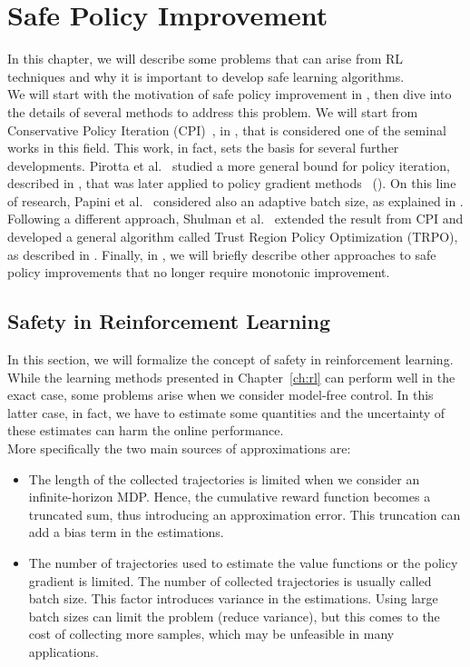 \chapter{Safe Policy Improvement}
\label{ch:safepg}
\thispagestyle{empty}

In this chapter, we will describe some problems that can arise from RL techniques and why it is important to develop safe learning algorithms. \\
We will start with the motivation of safe policy improvement in , then dive into the details of several methods to address this problem. We will start from Conservative Policy Iteration (CPI)~\cite{Kakade02approximatelyoptimal}, in , that is considered one of the seminal works in this field. This work, in fact, sets the basis for several further developments. Pirotta et al.~\cite{safe_iteration} studied a more general bound for policy iteration, described in , that was later applied to policy gradient methods~\cite{adaptive_step} (). On this line of research, Papini et al.~\cite{adaptive_batch} considered also an adaptive batch size, as explained in . Following a different approach, Shulman et al.~\cite{trpo} extended the result from CPI and developed a general algorithm called Trust Region Policy Optimization (TRPO), as described in . Finally, in , we will briefly describe other approaches to safe policy improvements that no longer require monotonic improvement.

\section{Safety in Reinforcement Learning}
\label{sec:whysafety}
In this section, we will formalize the concept of safety in reinforcement learning. While the learning methods presented in Chapter~\ref{ch:rl} can perform well in the exact case, some problems arise when we consider model-free control. In this latter case, in fact, we have to estimate some quantities and the uncertainty of these estimates can harm the online performance. \\
More specifically the two main sources of approximations are: 
\begin{itemize}
\item The length of the collected trajectories is limited when we consider an infinite-horizon MDP. Hence, the cumulative reward function becomes a truncated sum, thus introducing an approximation error. This truncation can add a bias term in the estimations. 
\item The number of trajectories used to estimate the value functions or the policy gradient is limited. The number of collected trajectories is usually called batch size. This factor introduces variance in the estimations. Using large batch sizes can limit the problem (reduce variance), but this comes to the cost of collecting more samples, which may be unfeasible in many applications.
\end{itemize}

